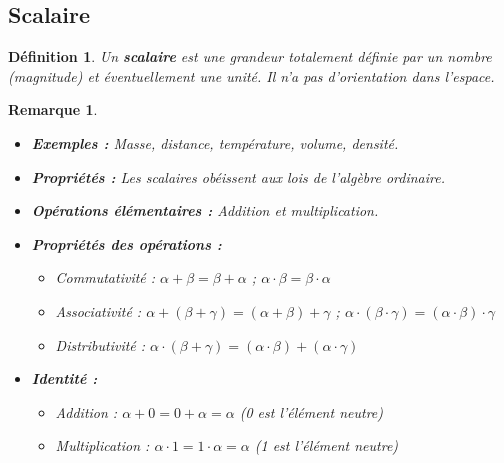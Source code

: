 \documentclass{article}
\newtheorem{definition}{Définition}
\newtheorem{remark}{Remarque}
\begin{document}
\subsection{Scalaire}
\begin{definition}
Un \textbf{scalaire} est une grandeur totalement définie par un nombre (magnitude) et éventuellement une unité. Il n'a pas d'orientation dans l'espace.
\end{definition}
\begin{remark}
\begin{itemize}
    \item \textbf{Exemples :} Masse, distance, température, volume, densité.
    \item \textbf{Propriétés :} Les scalaires obéissent aux lois de l'algèbre ordinaire.
    \item \textbf{Opérations élémentaires :} Addition et multiplication.
    \item \textbf{Propriétés des opérations :}
    \begin{itemize}
        \item Commutativité : $\alpha + \beta = \beta + \alpha$ ; $\alpha \cdot \beta = \beta \cdot \alpha$
        \item Associativité : $\alpha + (\beta + \gamma) = (\alpha + \beta) + \gamma$ ; $\alpha \cdot (\beta \cdot \gamma) = (\alpha \cdot \beta) \cdot \gamma$
        \item Distributivité : $\alpha \cdot (\beta + \gamma) = (\alpha \cdot \beta) + (\alpha \cdot \gamma)$
    \end{itemize}
    \item \textbf{Identité :}
    \begin{itemize}
        \item Addition : $\alpha + 0 = 0 + \alpha = \alpha$ (0 est l'élément neutre)
        \item Multiplication : $\alpha \cdot 1 = 1 \cdot \alpha = \alpha$ (1 est l'élément neutre)
    \end{itemize}
\end{itemize}
\end{remark}
\end{document}
